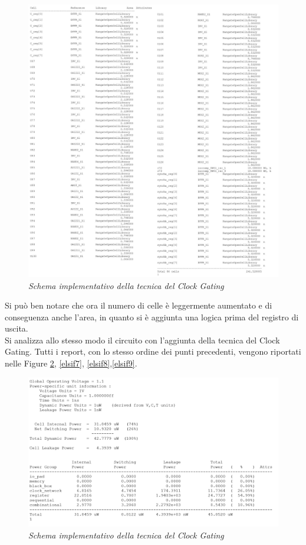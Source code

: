 \begin{figure}[!htb]
	\centering
	\includegraphics[scale=0.28]{immagini/elsif5}
	\caption{\textit{Schema implementativo della tecnica del Clock Gating}}
	\label{elsif5}
\end{figure}
\noindent Si può ben notare che ora il numero di celle è leggermente aumentato e di conseguenza anche l'area, in quanto si è aggiunta una logica prima del registro di uscita.\\
Si analizza allo stesso modo il circuito con l'aggiunta della tecnica del Clock Gating. Tutti i report, con lo stesso ordine dei punti precedenti, vengono riportati nelle Figure \ref{elsif6}, \ref{elsif7}, \ref{elsif8},\ref{elsif9}.\\
\begin{figure}[!htb]
	\centering
	\includegraphics[scale=0.65]{immagini/elsif6}
	\caption{\textit{Schema implementativo della tecnica del Clock Gating}}
	\label{elsif6}
\end{figure}
